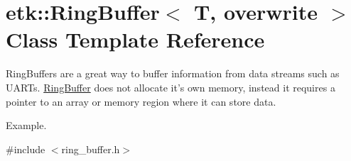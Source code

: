 \hypertarget{classetk_1_1_ring_buffer}{\section{etk\-:\-:Ring\-Buffer$<$ T, overwrite $>$ Class Template Reference}
\label{classetk_1_1_ring_buffer}
}


Ring\-Buffers are a great way to buffer information from data streams such as U\-A\-R\-Ts. \hyperlink{classetk_1_1_ring_buffer}{Ring\-Buffer} does not allocate it's own memory, instead it requires a pointer to an array or memory region where it can store data. \par
\par
 Example.  




{\ttfamily \#include $<$ring\-\_\-buffer.\-h$>$}


